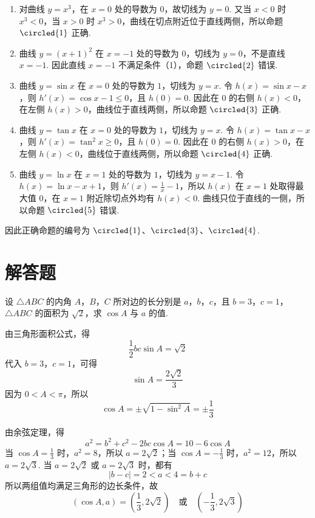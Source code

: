 \begin{solution}
\begin{enumerate}
\item 对曲线 \(y=x^3\)，在 \(x=0\) 处的导数为 \(0\)，故切线为 \(y=0\). 又当 \(x<0\) 时 \(x^3<0\)，当 \(x>0\) 时 \(x^3>0\)，曲线在切点附近位于直线两侧，所以命题 \(\circled{1}\) 正确.
\item 曲线 \(y=(x+1)^2\) 在 \(x=-1\) 处的导数为 \(0\)，切线为 \(y=0\)，不是直线 \(x=-1\). 因此直线 \(x=-1\) 不满足条件（1），命题 \(\circled{2}\) 错误.
\item 曲线 \(y=\sin x\) 在 \(x=0\) 处的导数为 \(1\)，切线为 \(y=x\). 令 \(h(x)=\sin x-x\)，则 \(h'(x)=\cos x-1\leqslant0\)，且 \(h(0)=0\). 因此在 \(0\) 的右侧 \(h(x)<0\)，在左侧 \(h(x)>0\)，曲线位于直线两侧，所以命题 \(\circled{3}\) 正确.
\item 曲线 \(y=\tan x\) 在 \(x=0\) 处的导数为 \(1\)，切线为 \(y=x\). 令 \(h(x)=\tan x-x\)，则 \(h'(x)=\tan^2x\geqslant0\)，且 \(h(0)=0\). 因此在 \(0\) 的右侧 \(h(x)>0\)，在左侧 \(h(x)<0\)，曲线位于直线两侧，所以命题 \(\circled{4}\) 正确.
\item 曲线 \(y=\ln x\) 在 \(x=1\) 处的导数为 \(1\)，切线为 \(y=x-1\). 令 \(h(x)=\ln x-x+1\)，则 \(h'(x)=\frac1x-1\)，所以 \(h(x)\) 在 \(x=1\) 处取得最大值 \(0\)，在 \(x=1\) 附近除切点外均有 \(h(x)<0\). 曲线只位于直线的一侧，所以命题 \(\circled{5}\) 错误.
\end{enumerate}
因此正确命题的编号为 \(\circled{1}\)、\(\circled{3}\)、\(\circled{4}\).
\end{solution}

\section{解答题}

\begin{problem}
设 \(\triangle ABC\) 的内角 \(A\)，\(B\)，\(C\) 所对边的长分别是 \(a\)，\(b\)，\(c\)，且 \(b = 3\)，\(c = 1\)，\(\triangle ABC\) 的面积为 \(\sqrt{2}\)，求 \(\cos A\) 与 \(a\) 的值.
\end{problem}

\begin{solution}
由三角形面积公式，得
\[
\frac{1}{2}bc\sin A=\sqrt{2}
\]
代入 \(b=3\)，\(c=1\)，可得
\[
\sin A=\frac{2\sqrt{2}}{3}
\]
因为 \(0<A<\pi\)，所以
\[
\cos A=\pm\sqrt{1-\sin^2 A}=\pm\frac{1}{3}
\]

由余弦定理，得
\[
a^2=b^2+c^2-2bc\cos A=10-6\cos A
\]
当 \(\cos A=\frac{1}{3}\) 时，\(a^2=8\)，所以 \(a=2\sqrt{2}\)；当 \(\cos A=-\frac{1}{3}\) 时，\(a^2=12\)，所以 \(a=2\sqrt{3}\).
当 \(a=2\sqrt{2}\) 或 \(a=2\sqrt{3}\) 时，都有
\[
|b-c|=2<a<4=b+c
\]
所以两组值均满足三角形的边长条件，故
\[
(\cos A,a)=\left(\frac{1}{3},2\sqrt{2}\right)\quad\text{或}\quad\left(-\frac{1}{3},2\sqrt{3}\right)
\]
\end{solution}

